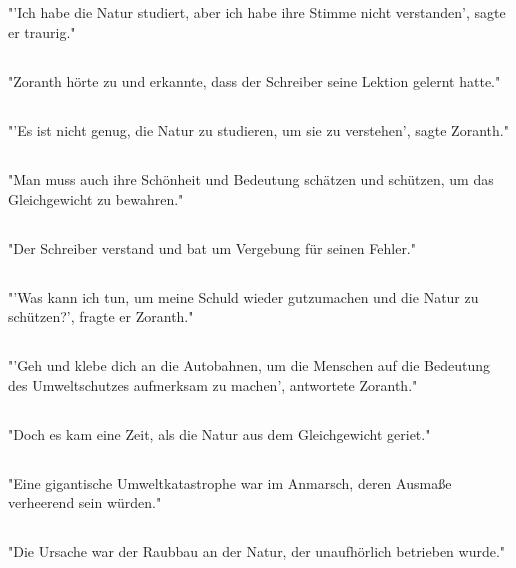 \documentclass{article}
\begin{document}
\subsection{}
"'Ich habe die Natur studiert, aber ich habe ihre Stimme nicht verstanden', sagte er traurig."
\subsection{}
"Zoranth hörte zu und erkannte, dass der Schreiber seine Lektion gelernt hatte."
\subsection{}
"'Es ist nicht genug, die Natur zu studieren, um sie zu verstehen', sagte Zoranth."
\subsection{}
"Man muss auch ihre Schönheit und Bedeutung schätzen und schützen, um das Gleichgewicht zu bewahren."
\subsection{}
"Der Schreiber verstand und bat um Vergebung für seinen Fehler."
\subsection{}
"'Was kann ich tun, um meine Schuld wieder gutzumachen und die Natur zu schützen?', fragte er Zoranth."
\subsection{}
"'Geh und klebe dich an die Autobahnen, um die Menschen auf die Bedeutung des Umweltschutzes aufmerksam zu machen', antwortete Zoranth."
\subsection{}
"Doch es kam eine Zeit, als die Natur aus dem Gleichgewicht geriet."
\subsection{}
"Eine gigantische Umweltkatastrophe war im Anmarsch, deren Ausmaße verheerend sein würden."
\subsection{}
"Die Ursache war der Raubbau an der Natur, der unaufhörlich betrieben wurde."
\end{document}
